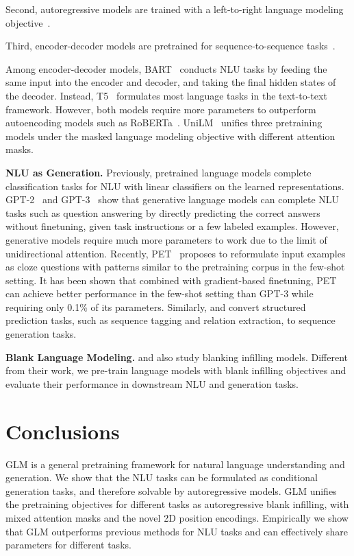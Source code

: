 Second, autoregressive models are trained with a left-to-right language modeling objective~\cite{GPT2018a,GPT2-2018,GPT3-2020}. 

Third, encoder-decoder models are pretrained for sequence-to-sequence tasks~\cite{songMASS2019,lewisBART2019,PALM2020,PEGASUS:zhang2020}. 

Among encoder-decoder models, BART~\cite{lewisBART2019} conducts NLU tasks by feeding the same input into the encoder and decoder, and taking the final hidden states of the decoder. Instead, T5~\cite{raffelT52020} formulates most language tasks in the text-to-text framework. However, both models require more parameters to outperform autoencoding models such as RoBERTa~\cite{RoBERTa}. UniLM~\cite{UniLM19,UniLMv220} unifies three pretraining models under the masked language modeling objective with different attention masks.

\textbf{NLU as Generation.} Previously, pretrained language models complete classification tasks for NLU with linear classifiers on the learned representations. GPT-2~\cite{GPT2-2018} and GPT-3~\cite{GPT3-2020} show that generative language models can complete NLU tasks such as question answering by directly predicting the correct answers without finetuning, given task instructions or a few labeled examples. However, generative models require much more parameters to work due to the limit of unidirectional attention. Recently, PET~\cite{PET:2001-07676,PET2:2009-07118} proposes to reformulate input examples as cloze questions with patterns similar to the pretraining corpus in the few-shot setting. It has been shown that combined with gradient-based finetuning, PET can achieve better performance in the few-shot setting than GPT-3 while requiring only 0.1\% of its parameters. Similarly, \citet{Augmented2020} and \citet{Augmented2021} convert structured prediction tasks, such as sequence tagging and relation extraction, to sequence generation tasks. 

\textbf{Blank Language Modeling.} \citet{Fillin2020} and \citet{BLM2020} also study blanking infilling models. Different from their work, we pre-train language models with blank infilling objectives and evaluate their performance in downstream NLU and generation tasks.

\section{Conclusions}
GLM is a general pretraining framework for natural language understanding and generation. We show that the NLU tasks can be formulated as conditional generation tasks, and therefore solvable by autoregressive models. GLM unifies the pretraining objectives for different tasks as autoregressive blank infilling, with mixed attention masks and the novel 2D position encodings. Empirically we show that GLM outperforms previous methods for NLU tasks and can effectively share parameters for different tasks. 


